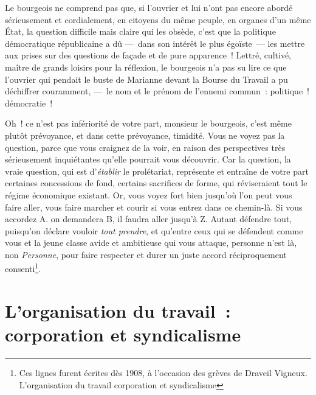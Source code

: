 \documentclass[french,twoside]{book} %
\begin{document}
\noindent Le bourgeois ne comprend pas que, si l’ouvrier et lui n’ont pas encore abordé sérieusement et cordialement, en citoyens du même peuple, en organes d’un même État, la question difficile mais claire qui les obsède, c’est que la politique démocratique républicaine a dû — dans son intérêt le plus égoïste — les mettre aux prises sur des questions de façade et de pure apparence ! Lettré, cultivé, maître de grands loisirs pour la réflexion, le bourgeois n’a pas su lire ce que l’ouvrier qui pendait le buste de Marianne devant la Bourse du Travail a pu déchiffrer couramment, — le nom et le prénom de l’ennemi commun : politique ! démocratie !\par
Oh ! ce n’est pas infériorité de votre part, monsieur le bourgeois, c’est même plutôt prévoyance, et dans cette prévoyance, timidité. Vous ne voyez pas la question, parce que vous craignez de la voir, en raison des perspectives très sérieusement inquiétantes qu’elle pourrait vous découvrir. Car la question, la vraie question, qui est d’\emph{établir} le prolétariat, représente et entraîne de votre part certaines concessions de fond, certains sacrifices de forme, qui réviseraient tout le régime économique existant. Or, vous voyez fort bien jusqu’où l’on peut vous faire aller, vous faire marcher et courir si vous entrez dans ce chemin-là. Si vous accordez A. on demandera B, il faudra aller jusqu’à Z. Autant défendre tout, puisqu’on déclare vouloir \emph{tout prendre}, et qu’entre ceux qui se défendent comme vous et la jeune classe avide et ambitieuse qui vous attaque, personne n’est là, non \emph{Personne}, pour faire respecter et durer un juste accord réciproquement consenti\footnote{Ces lignes furent écrites dès 1908, à l’occasion des grèves de Draveil Vigneux. L’organisation du travail corporation et syndicalisme}.
\section[{L’organisation du travail : corporation et syndicalisme}]{L’organisation du travail : corporation et syndicalisme}
\end{document}
